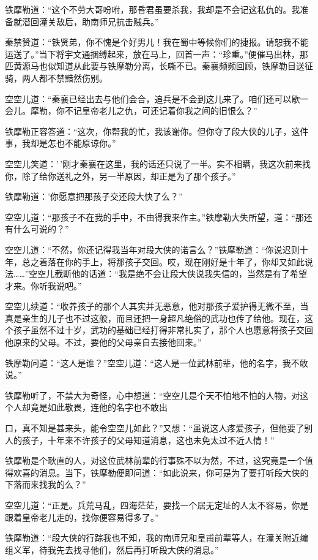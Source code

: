\documentclass[12pt,oneside]{book}
\begin{document}
铁摩勒道：``这个不劳大哥吩咐，那昏君虽要杀我，我却是不会记这私仇的。我准备就潜回潼关敌后，助南师兄抗击贼兵。''

秦禁赞道：``铁贤弟，你不愧是个好男儿！我在蜀中等候你们的捷报。请恕我不能运送了。''当下将宇文通捆缚起来，放在马上，回首一声：``珍重。''便催马出林，那匹黄源马也似知道从此要与铁摩勒分离，长嘶不已。秦襄频频回顾，铁摩勒目送征骑，两人都不禁黯然伤别。

空空儿道：``秦襄已经出去与他们会合，追兵是不会到这儿来了。咱们还可以歇一会儿。摩勒，你不记皇帝老儿之仇，可还记着你我之间的旧恨么？''

铁摩勒正容答道：``这次，你帮我的忙，我该谢你。但你夺了段大侠的儿子，这件事，我却是怎也不能原谅你。''

空空儿笑道：'\,'刚才秦襄在这里，我的话还只说了一半。实不相瞒，我这次前来找你，除了给你送礼之外，另一半原因，却正是为了那个孩子。''

铁摩勒道：'你愿意把那孩子交还段大快了么？''

空空儿道：``那孩子不在我的手中，不由得我来作主。''铁摩勒大失所望，道：``那还有什么可说的？''

空空儿道：``不然，你还记得我当年对段大侠的诺言么？''铁摩勒道：``你说迟则十年，总之着落在你的手上，将那孩子交回。哎，现在刚好是十年了，你却又如此说法\ldots\ldots{}''空空儿截断他的话道：``我是绝不会让段大侠说我失信的，当然是有了希望才来。你听我说吧。''

空空儿续道：``收养孩子的那个人其实并无恶意，他对那孩子爱护得无微不至，当真是亲生的儿子也不过这般，而且还把一身超凡绝俗的武功也传了给他。现在，这个孩子虽然不过十岁，武功的基础已经打得非常扎实了，那个人也愿意将孩子交回他原来的父母。不过，要他的父母亲自去接他回来。''

铁摩勒问道：``这人是谁？''空空儿道：``这人是一位武林前辈，他的名字，我不敢说。''

铁摩勒听了，不禁大为奇怪，心中想道：``空空儿是个天不怕地不怕的人物，对这个人却竟是如此敬畏，连他的名字也不敢出

口，真不知是甚来头，能令空空儿如此？''又想：``虽说这人疼爱孩子，但他要了别人的孩子，十年来不许孩子的父母知道消息，这也未免太过不近人情！''

铁摩勒是个耿直的人，对这位武林前辈的行事殊不以为然，不过，这究竟是一个值得欢喜的消息。当下，铁摩勒便即问道：``如此说来，你可是为了要打听段大侠的下落而来找我的么？''

空空儿道：``正是。兵荒马乱，四海茫茫，要找一个居无定址的人太不容易，你是跟着皇帝老儿走的，找你便容易得多了。''

铁摩勒道：``段大侠的行踪我也不知，我的南师兄和皇甫前辈等人，在潼关附近编组义军，待我先去找寻他们，然后再打听段大侠的消息。''
\end{document}
